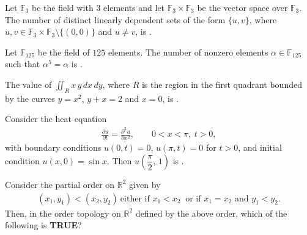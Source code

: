 \documentclass[journal,12pt,onecolumn]{IEEEtran}
\theoremstyle{remark}
\begin{document}
\begin{enumerate}
{\hfill{}

\item Let $\mathbb{F}_{3}$ be the field with $3$ elements and let
$\mathbb{F}_{3}\times\mathbb{F}_{3}$ be the vector space over $\mathbb{F}_{3}$.
The number of distinct linearly dependent sets of the form $\{u,v\}$, where
$u,v\in\mathbb{F}_{3}\times\mathbb{F}_{3}\setminus\{(0,0)\}$ and $u\ne v$, is
\underline{\hspace{2.8cm}}.

\hfill{}

\item Let $\mathbb{F}_{125}$ be the field of $125$ elements. The number of nonzero elements
$\alpha\in\mathbb{F}_{125}$ such that $\alpha^{5}=\alpha$ is
\underline{\hspace{3.0cm}}.\ 

\hfill{}

\item The value of $\displaystyle \iint_{R} x\,y\,dx\,dy$, where $R$ is the region in the first quadrant
bounded by the curves $y=x^{2}$, $y+x=2$ and $x=0$, is
\underline{\hspace{3.2cm}}.\

\hfill{}

\item Consider the heat equation
\begin{align*}
\frac{\partial u}{\partial t}=\frac{\partial^{2}u}{\partial x^{2}},\qquad 0<x<\pi,\ t>0,
\end{align*}
with boundary conditions \(u(0,t)=0\), \(u(\pi,t)=0\) for \(t>0\), and initial condition
\(u(x,0)=\sin x\). Then \(u\!\left(\dfrac{\pi}{2},\,1\right)\) is
\underline{\hspace{2.8cm}}.\

\hfill{}

\item Consider the partial order on $\mathbb{R}^{2}$ given by
\begin{align*}
(x_{1},y_{1})<(x_{2},y_{2})\ \text{either if }x_{1}<x_{2}\ \text{ or if }x_{1}=x_{2}\text{ and }y_{1}<y_{2}.
\end{align*}
Then, in the order topology on $\mathbb{R}^{2}$ defined by the above order, which of the
following is \textbf{TRUE}?

\hfill{}

}
\end{enumerate}
\end{document}
